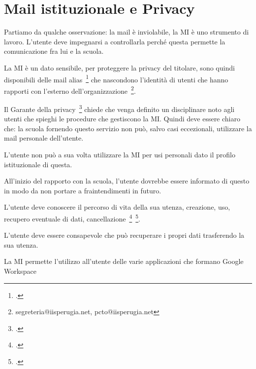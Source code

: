 \section{Mail istituzionale e Privacy}
Partiamo da qualche osservazione: la mail è inviolabile, la 
MI è uno strumento di lavoro. L'utente deve impegnarsi a controllarla perché questa permette la comunicazione fra lui e la scuola. 

La MI è 
un dato sensibile, per proteggere la privacy del titolare,  sono quindi 
disponibili delle mail alias~\footcite{Garante2007} che nascondono l'identità di utenti 
che  hanno rapporti 
con l'esterno dell'organizzazione~\footnote{segreteria@iisperugia.net, pcto@iisperugia.net}. 

Il Garante della privacy~\footcite{Garante2007} chiede che 
venga definito un disciplinare noto agli utenti che spieghi le procedure che gestiscono la MI. Quindi deve essere chiaro che:
la scuola fornendo questo servizio non può, salvo casi eccezionali, utilizzare 
la mail personale dell'utente.

L'utente non può a sua volta utilizzare la MI per  usi  
personali dato il profilo istituzionale di questa. 

 All'inizio del rapporto con la scuola, l'utente dovrebbe essere informato di questo 
in modo da non portare a fraintendimenti in futuro.

L'utente deve conoscere il percorso di vita della sua utenza, creazione, uso, 
recupero eventuale di dati, 
cancellazione~\footcite{Garante2007}~\footcite{Garante2019}. 

L'utente deve 
essere consapevole che 
può recuperare i propri dati trasferendo  la sua utenza. 

La MI permette l'utilizzo all'utente delle varie applicazioni che formano \textenglish{Google Workspace}
